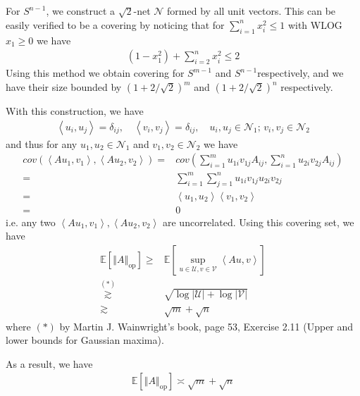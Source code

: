 \documentclass[11pt,a4paper]{ctexart}
\numberwithin{equation}{section}%
\begin{document}
\subsection{}

For $ S^{n-1} $, we construct a $ \sqrt{2} $-net $ \mathcal{N} $ formed by all unit vectors. This can be easily verified to be a covering by noticing that for $ \sum_{i=1}^n x_i^2 \leq 1 $ with WLOG $ x_1\geq 0 $ we have
\begin{align*}
     (1-x_1^2) + \sum_{i=2}^n x_i^2 \leq 2
\end{align*}
Using this method we obtain covering for $ S^{m-1} $ and $ S^{n-1} $respectively, and we have their size bounded by $ (1+2/\sqrt{2})^m $ and $ (1+2/\sqrt{2})^n $ respectively.

With this construction, we have
\begin{align*}
    \left\langle u_i,u_j \right\rangle =\delta _{ij},\quad \left\langle v_i,v_j \right\rangle =\delta _{ij},\quad u_i,u_j\in \mathcal{N}_1;\,v_i,v_j\in \mathcal{N}_2 
\end{align*}
and thus for any $ u_1 ,u_2\in \mathcal{N}_1 $ and $ v_1,v_2\in \mathcal{N}_2 $ we have
\begin{align*}
    cov\left( \left\langle Au_1,v_1 \right\rangle , \left\langle Au_2,v_2 \right\rangle  \right) = & cov( \sum_{i=1}^m u_{1i}v_{1j}A_{ij}, \sum_{i=1}^n u_{2i}v_{2j}A_{ij} ) \\
    =& \sum_{i=1}^m \sum_{j=1}^n u_{1i}v_{1j}u_{2i}v_{2j}\\
    =& \left\langle u_1,u_2 \right\rangle \left\langle v_1,v_2 \right\rangle\\
    =& 0
\end{align*}
i.e. any two $ \left\langle Au_1,v_1 \right\rangle , \left\langle Au_2,v_2 \right\rangle  $ are uncorrelated. Using this covering set, we have
\begin{align*}
    \mathbb{E}\left[ \left\Vert A \right\Vert _\mathrm{ op }  \right] \geq & \mathbb{E}\left[ \sup_{u\in \mathcal{U},v\in \mathcal{V}}\left\langle Au, v \right\rangle  \right] \\
    \mathop{ {\gtrsim} }\limits^{(*)}  & \sqrt{\log \left\vert \mathcal{U} \right\vert + \log \left\vert \mathcal{V} \right\vert } \\
    \gtrsim & \sqrt{m} + \sqrt{n}
\end{align*}
where $ (*) $ by Martin J. Wainwright's book, page 53, Exercise 2.11 (Upper and lower bounds for Gaussian maxima).


As a result, we have
\begin{align*}
    \mathbb{E}\left[ \left\Vert A \right\Vert _\mathrm{ op }  \right]  \asymp \sqrt{m} + \sqrt{n}  
\end{align*}
\end{document}
